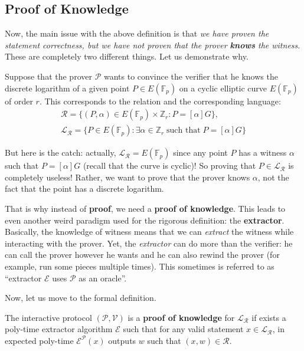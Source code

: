 \documentclass[../lecture-notes.tex]{subfiles}
\begin{document}
\subsection{Proof of Knowledge}

Now, the main issue with the above definition is that \textit{we have proven the statement correctness, but we have not proven that the prover \textbf{knows} the witness}. These are completely two different things. Let us demonstrate why.

\begin{example}
    Suppose that the prover $\mathcal{P}$ wants to convince the verifier that he knows the discrete logarithm of a given point $P \in E(\mathbb{F}_p)$ on a cyclic elliptic curve $E(\mathbb{F}_p)$ of order $r$. This corresponds to the relation and the corresponding language:
    \begin{align*}
        \mathcal{R} = \{(P, \alpha) \in E(\mathbb{F}_p) \times \mathbb{Z}_r: P = [\alpha] G\}, \\ \mathcal{L}_{\mathcal{R}} = \{P \in E(\mathbb{F}_p): \exists \alpha \in \mathbb{Z}_r \; \text{such that} \; P = [\alpha] G\}
    \end{align*}

    But here is the catch: actually, $\mathcal{L}_{\mathcal{R}} = E(\mathbb{F}_p)$ since any point $P$ has a witness $\alpha$ such that $P = [\alpha] G$ (recall that the curve is cyclic)! So proving that $P \in \mathcal{L}_{\mathcal{R}}$ is completely useless! Rather, we want to prove that the prover knows $\alpha$, not the fact that the point has a discrete logarithm.
\end{example}

That is why instead of \textbf{proof}, we need a \textbf{proof of knowledge}. This leads to even another weird paradigm used for the rigorous definition: the \textbf{extractor}. Basically, the knowledge of witness means that we can \textit{extract} the witness while interacting with the prover. Yet, the \textit{extractor} can do more than the verifier: he can call the prover however he wants and he can also rewind the prover (for example, run some pieces multiple times). This sometimes is referred to as ``extractor $\mathcal{E}$ uses $\mathcal{P}$ as an oracle''. 

Now, let us move to the formal definition.

\begin{definition}
    The interactive protocol $(\mathcal{P}, \mathcal{V})$ is a \textbf{proof of knowledge} for $\mathcal{L}_{\mathcal{R}}$ if exists a poly-time extractor algorithm $\mathcal{E}$ such that for any valid statement $x \in \mathcal{L}_{\mathcal{R}}$, in expected poly-time $\mathcal{E}^{\mathcal{P}}(x)$ outputs $w$ such that $(x,w) \in \mathcal{R}$.
\end{definition}
\end{document}

